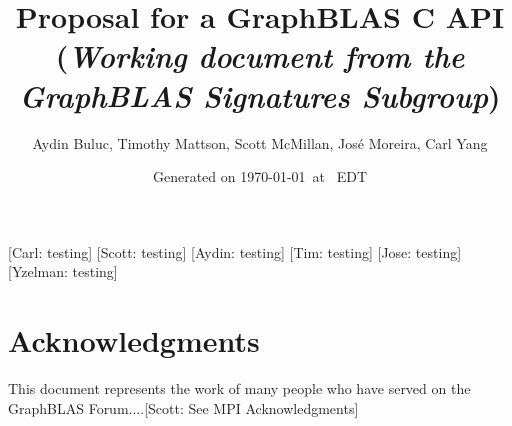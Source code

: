 \documentclass[11pt]{extarticle}
\begin{document}
\linenumbers

\title{Proposal for a GraphBLAS C API\\ (\emph{\large Working document from the \emph{GraphBLAS} Signatures Subgroup})}
\author{Aydin Buluc, Timothy Mattson, Scott McMillan, Jos\'e Moreira, Carl Yang}
\date{Generated on \today\ at \currenttime\ EDT}

\renewcommand{\vector}[1]{{\bf #1}}
\renewcommand{\matrix}[1]{{\bf #1}}
\newcommand{\zip}{{\mbox{zip}}}
\newcommand{\zap}{{\mbox{zap}}}
\newcommand{\ewiseadd}{{\mbox{\bf ewiseadd}}}
\newcommand{\ewisemult}{{\mbox{\bf ewisemult}}}
\newcommand{\mxm}{{\mbox{\bf mxm}}}
\newcommand{\vxm}{{\mbox{\bf vxm}}}
\newcommand{\mxv}{{\mbox{\bf mxv}}}
\newcommand{\gpit}[1]{{\sf #1}}
\newcommand{\ie}{\emph{i.e.}}
\newcommand{\eg}{\emph{e.g.}}
\newcommand{\nan}{{\sf NaN}}
\newcommand{\nil}{{\bf nil}}
\newcommand{\ifif}{{\bf if}}
\newcommand{\ifthen}{{\bf then}}
\newcommand{\ifelse}{{\bf else}}
\newcommand{\ifendif}{{\bf endif}}
\newcommand{\zero}{{\bf 0}}
\newcommand{\one}{{\bf 1}}

\newcommand{\aydin}[1]{{{\color{orange}[Aydin: #1]}}}
\newcommand{\scott}[1]{{{\color{violet}[Scott: #1]}}}
\newcommand{\tim}[1]{{{\color{teal}[Tim: #1]}}}
\newcommand{\jose}[1]{{{\color{red}[Jose: #1]}}}
\newcommand{\carl}[1]{{{\color{blue}[Carl: #1]}}}
\newcommand{\ajy}[1]{{{\color{brown}[Yzelman: #1]}}}
\renewcommand{\comment}[1]{{}}

\setlength{\parskip}{0.5\baselineskip}
\setlength{\parindent}{0ex}

\maketitle

\carl{testing}
\scott{testing}
\aydin{testing}
\tim{testing}
\jose{testing}
\ajy{testing}

\begin{abstract}
\end{abstract}

\pagebreak
\tableofcontents
\pagebreak


\section*{Acknowledgments}

This document represents the work of many people who have served on the 
GraphBLAS Forum....\scott{See MPI Acknowledgments}
\end{document}
